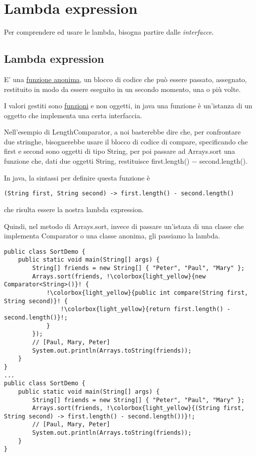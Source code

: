\chapter{Lambda expression}
Per comprendere ed usare le lambda, bisogna partire dalle \textit{interfacce}.



\section{Lambda expression}
E' una \underline{funzione anonima}, un blocco di codice che può essere passato, assegnato, restituito in modo da essere eseguito in un secondo momento, una o più volte.

I valori gestiti sono \underline{funzioni} e non oggetti, in java una funzione è un'istanza di un oggetto che implementa una certa interfaccia.
\smallskip

Nell'esempio di LengthComparator, a noi basterebbe dire che, per confrontare due stringhe, bisognerebbe usare il blocco di codice di compare, specificando che first e 
second sono oggetti di tipo String, per poi passare ad Arrays.sort una funzione che, dati due oggetti String, restituisce first.length() $-$ second.length().

In java, la sintassi per definire questa funzione è

\begin{lstlisting}
(String first, String second) -> first.length() - second.length()
\end{lstlisting}

che risulta essere la nostra lambda expression.

Quindi, nel metodo di Arrays.sort, invece di passare un'istaza di una classe che implementa Comparator o una classe anonima, gli passiamo la lambda.
\begin{lstlisting}[escapechar=!]
public class SortDemo {
    public static void main(String[] args) {
        String[] friends = new String[] { "Peter", "Paul", "Mary" };
        Arrays.sort(friends, !\colorbox{light_yellow}{new Comparator<String>()}! { 
            !\colorbox{light_yellow}{public int compare(String first, String second)}! {
                !\colorbox{light_yellow}{return first.length() - second.length()}!;
            }
        });
        // [Paul, Mary, Peter]
        System.out.println(Arrays.toString(friends));
    }
}
... 
public class SortDemo {
    public static void main(String[] args) {
        String[] friends = new String[] { "Peter", "Paul", "Mary" };
        Arrays.sort(friends, !\colorbox{light_yellow}{(String first, String second) -> first.length() - second.length())}!;
        // [Paul, Mary, Peter]
        System.out.println(Arrays.toString(friends));
    }
} 
\end{lstlisting}

